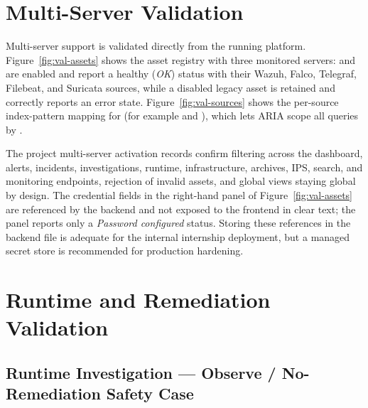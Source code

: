 \section{Multi-Server Validation}
\label{sec:val-multi}

Multi-server support is validated directly from the running platform. Figure~\ref{fig:val-assets} shows the asset registry with three monitored servers:  and  are enabled and report a healthy (\emph{OK}) status with their Wazuh, Falco, Telegraf, Filebeat, and Suricata sources, while a disabled legacy asset is retained and correctly reports an error state. Figure~\ref{fig:val-sources} shows the per-source index-pattern mapping for  (for example  and ), which lets ARIA scope all queries by .



The project multi-server activation records confirm  filtering across the dashboard, alerts, incidents, investigations, runtime, infrastructure, archives, IPS, search, and monitoring endpoints, rejection of invalid assets, and global views staying global by design. The credential fields in the right-hand panel of Figure~\ref{fig:val-assets} are referenced by the backend and not exposed to the frontend in clear text; the panel reports only a \emph{Password configured} status. Storing these references in the backend  file is adequate for the internal internship deployment, but a managed secret store is recommended for production hardening.

\section{Runtime and Remediation Validation}
\label{sec:val-runtime}

\subsection{Runtime Investigation --- Observe / No-Remediation Safety Case}

